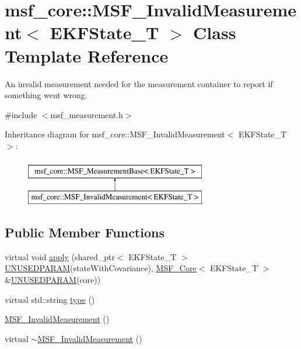 \hypertarget{classmsf__core_1_1MSF__InvalidMeasurement}{\section{msf\-\_\-core\-:\-:M\-S\-F\-\_\-\-Invalid\-Measurement$<$ E\-K\-F\-State\-\_\-\-T $>$ Class Template Reference}
\label{classmsf__core_1_1MSF__InvalidMeasurement}
}


An invalid measurement needed for the measurement container to report if something went wrong.  




{\ttfamily \#include $<$msf\-\_\-measurement.\-h$>$}

Inheritance diagram for msf\-\_\-core\-:\-:M\-S\-F\-\_\-\-Invalid\-Measurement$<$ E\-K\-F\-State\-\_\-\-T $>$\-:\begin{figure}[H]
\begin{center}
\leavevmode
\includegraphics[height=2.000000cm]{classmsf__core_1_1MSF__InvalidMeasurement}
\end{center}
\end{figure}
\subsection*{Public Member Functions}
\begin{DoxyCompactItemize}
\item 
virtual void \hyperlink{classmsf__core_1_1MSF__InvalidMeasurement_a47d514cedc4596c60d0f0949d61200cf}{apply} (shared\-\_\-ptr$<$ E\-K\-F\-State\-\_\-\-T $>$ \hyperlink{msf__macros_8h_a2d2af1048de7b1510994ffd3bc32aacc}{U\-N\-U\-S\-E\-D\-P\-A\-R\-A\-M}(state\-With\-Covariance), \hyperlink{classmsf__core_1_1MSF__Core}{M\-S\-F\-\_\-\-Core}$<$ E\-K\-F\-State\-\_\-\-T $>$ \&\hyperlink{msf__macros_8h_a2d2af1048de7b1510994ffd3bc32aacc}{U\-N\-U\-S\-E\-D\-P\-A\-R\-A\-M}(core))
\item 
virtual std\-::string \hyperlink{classmsf__core_1_1MSF__InvalidMeasurement_abe3df54c608c49a3a26905b5d953713a}{type} ()
\item 
\hyperlink{classmsf__core_1_1MSF__InvalidMeasurement_a9de779048641efba62e57011cb54f060}{M\-S\-F\-\_\-\-Invalid\-Measurement} ()
\item 
virtual \hyperlink{classmsf__core_1_1MSF__InvalidMeasurement_aad62066f23c196f38607f66278dd0eac}{$\sim$\-M\-S\-F\-\_\-\-Invalid\-Measurement} ()
\end{DoxyCompactItemize}
